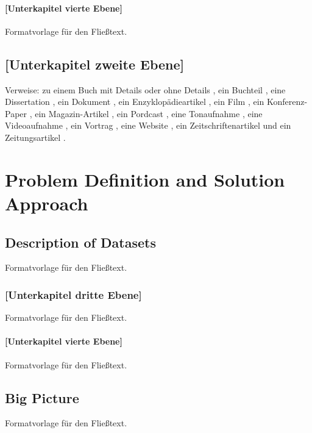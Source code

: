 \documentclass[a4paper,12pt,twoside]{scrreprt}
\begin{document}
\subsubsection{[Unterkapitel vierte Ebene]}
Formatvorlage für den Fließtext.



\section{[Unterkapitel zweite Ebene]}

Verweise: zu einem Buch mit Details \cite[vgl.][Kapitel 2]{bathe_finite-elemente-methoden_1990} oder ohne Details \cite{bathe_finite-elemente-methoden_1990}, ein Buchteil \cite{areger_problem-based_2007}, eine Dissertation \cite{sporn_interaktives_2000}, ein Dokument \cite{industriellenvereinigung_beste_2014}, ein Enzyklopädieartikel \cite{brockhaus_kreativitat_1872}, ein Film \cite{de_wilde_through_2008}, ein Konferenz-Paper \cite{weber_podcasts._2006}, ein Magazin-Artikel \cite{autornachname1_magazinartikeltitel_1995}, ein Pordcast \cite{paulus_horen_????}, eine Tonaufnahme \cite{horowitz_horowitz_2003}, eine Videoaufnahme \cite{fhvlearningsupport_was_2008}, ein Vortrag \cite{kohls_literaturverwaltung_2008}, eine Website \cite{wedekind_von_2008}, ein Zeitschriftenartikel \cite{hofer_wir_2008} und ein Zeitungsartikel \cite{schenkel_tsunami_2012}.


\chapter{Problem Definition and Solution Approach}

\section{Description of Datasets}
Formatvorlage für den Fließtext.

\subsection{[Unterkapitel dritte Ebene]}
Formatvorlage für den Fließtext.

\subsubsection{[Unterkapitel vierte Ebene]}
Formatvorlage für den Fließtext.

\section{Big Picture}
Formatvorlage für den Fließtext.
\end{document}
